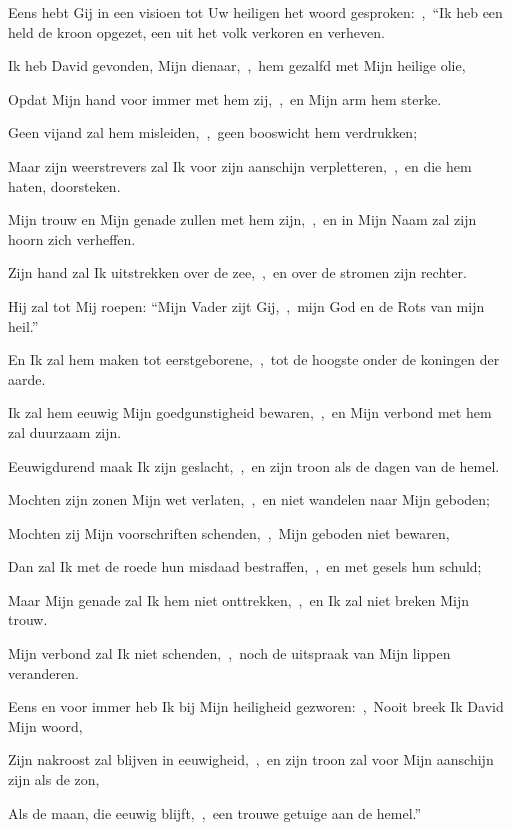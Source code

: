 \documentclass[12pt,twoside,a5paper]{article}
\begin{document}
\begin{halfparskip}
  Eens hebt Gij in een visioen tot Uw heiligen het woord gesproken:~\sep\ ``Ik heb een held de kroon opgezet, een uit het volk verkoren en verheven.

  Ik heb David gevonden, Mijn dienaar,~\sep\ hem gezalfd met Mijn heilige olie,

  Opdat Mijn hand voor immer met hem zij,~\sep\ en Mijn arm hem sterke.

  Geen vijand zal hem misleiden,~\sep\ geen booswicht hem verdrukken;

  Maar zijn weerstrevers zal Ik voor zijn aanschijn verpletteren,~\sep\ en die hem haten, doorsteken.

  Mijn trouw en Mijn genade zullen met hem zijn,~\sep\ en in Mijn Naam zal zijn hoorn zich verheffen.

  Zijn hand zal Ik uitstrekken over de zee,~\sep\ en over de stromen zijn rechter.

  Hij zal tot Mij roepen: ``Mijn Vader zijt Gij,~\sep\ mijn God en de Rots van mijn heil.''

  En Ik zal hem maken tot eerstgeborene,~\sep\ tot de hoogste onder de koningen der aarde.

  Ik zal hem eeuwig Mijn goedgunstigheid bewaren,~\sep\ en Mijn verbond met hem zal duurzaam zijn.

  Eeuwigdurend maak Ik zijn geslacht,~\sep\ en zijn troon als de dagen van de hemel.
\end{halfparskip}


\begin{halfparskip}
  Mochten zijn zonen Mijn wet verlaten,~\sep\ en niet wandelen naar Mijn geboden;

  Mochten zij Mijn voorschriften schenden,~\sep\ Mijn geboden niet bewaren,

  Dan zal Ik met de roede hun misdaad bestraffen,~\sep\ en met gesels hun schuld;

  Maar Mijn genade zal Ik hem niet onttrekken,~\sep\ en Ik zal niet breken Mijn trouw.

  Mijn verbond zal Ik niet schenden,~\sep\ noch de uitspraak van Mijn lippen veranderen.

  Eens en voor immer heb Ik bij Mijn heiligheid gezworen:~\sep\ Nooit breek Ik David Mijn woord,

  Zijn nakroost zal blijven in eeuwigheid,~\sep\ en zijn troon zal voor Mijn aanschijn zijn als de zon,

  Als de maan, die eeuwig blijft,~\sep\ een trouwe getuige aan de hemel.''
\end{halfparskip}
\end{document}
